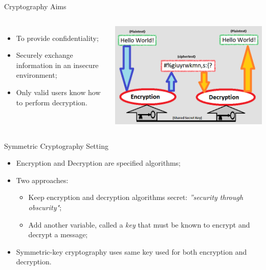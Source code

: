 \documentclass[12pt]{beamer}
\begin{document}
\begin{frame}{Cryptography Aims}
\begin{columns}
\begin{itemize}
\item To provide confidentiality;\pause
\item Securely exchange information in an insecure environment;\pause
\item Only valid users know how to perform decryption.\pause
\end{itemize}
\begin{center}
\includegraphics[scale=.35]{crypto.png}
\end{center}
\end{columns}
\end{frame}


\begin{frame}{Symmetric Cryptography Setting}
\begin{itemize}
\item Encryption and Decryption are specified algorithms;\pause
\item Two approaches:\pause
\begin{itemize}
\item Keep encryption and decryption algorithms secret: \textit{''security through
obscurity"};\pause
\item Add another variable, called a \textit{key} that must be known to encrypt and
decrypt a message;\pause
\end{itemize}
\item Symmetric-key cryptography uses same key used for both encryption and decryption.
\end{itemize}
\end{frame}
\end{document}
